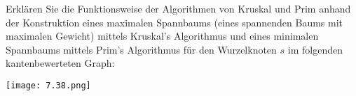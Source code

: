 
\begin{exercise}

Erklären Sie die Funktionsweise der Algorithmen von Kruskal und Prim anhand der Konstruktion eines maximalen Spannbaums (eines spannenden Baums mit maximalen Gewicht) mittels Kruskal's Algorithmus und eines minimalen Spannbaums mittels Prim's Algorithmus für den Wurzelknoten $s$ im folgenden kantenbewerteten Graph:

\begin{center}
    \texttt{[image: 7.38.png]}
\end{center}

\end{exercise}


